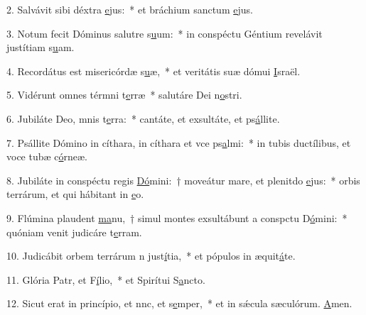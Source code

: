2. Salvávit sibi déxtra \uline{e}jus:~* et bráchium sanctum \uline{e}jus.\par 
3. Notum fecit Dóminus salutre s\uline{u}um:~* in conspéctu Géntium revelávit justítiam s\uline{u}am.\par 
4. Recordátus est misericórdæ s\uline{u}æ,~* et veritátis suæ dómui \uline{I}sraël.\par 
5. Vidérunt omnes térmni t\uline{e}rræ~* salutáre Dei n\uline{o}stri.\par 
6. Jubiláte Deo, mnis t\uline{e}rra:~* cantáte, et exsultáte, et ps\uline{á}llite.\par 
7. Psállite Dómino in cíthara, in cíthara et vce ps\uline{a}lmi:~* in tubis ductílibus, et voce tubæ c\uline{ó}rneæ.\par 
8. Jubiláte in conspéctu regis \uline{Dó}mini:~† moveátur mare, et plenitdo \uline{e}jus:~* orbis terrárum, et qui hábitant in \uline{e}o.\par 
9. Flúmina plaudent \uline{ma}nu,~† simul montes exsultábunt a conspctu D\uline{ó}mini:~* quóniam venit judicáre t\uline{e}rram.\par 
10. Judicábit orbem terrárum n just\uline{í}tia,~* et pópulos in æquit\uline{á}te.\par 
11. Glória Patr, et F\uline{í}lio,~* et Spirítui S\uline{a}ncto.\par 
12. Sicut erat in princípio, et nnc, et s\uline{e}mper,~* et in sǽcula sæculórum. \uline{A}men.\par 
